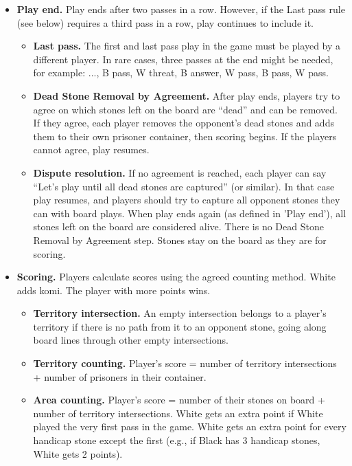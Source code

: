 \documentclass[11pt]{article}
\begin{document}
\begin{itemize}
\item \textbf{Play end.} Play ends after two passes in a row.
However, if the Last pass rule (see below) requires a third pass in a row, play continues to include it.
    \begin{itemize}
    \item \textbf{Last pass.} The first and last pass play in the game must be played by a different player.
    In rare cases, three passes at the end might be needed, for example: ..., B pass, W threat, B answer, W pass, B pass, W pass.
    \item \textbf{Dead Stone Removal by Agreement.} After play ends, players try to agree on which stones left on the board are ``dead'' and can be removed.
    If they agree, each player removes the opponent's dead stones and adds them to their own prisoner container, then scoring begins.
    If the players cannot agree, play resumes.
    \item \textbf{Dispute resolution.} If no agreement is reached, each player can say ``Let's play until all dead stones are captured'' (or similar).
    In that case play resumes, and players should try to capture all opponent stones they can with board plays.
    When play ends again (as defined in 'Play end'), all stones left on the board are considered alive.
    There is no Dead Stone Removal by Agreement step.
    Stones stay on the board as they are for scoring.
    \end{itemize}

\item \textbf{Scoring.} Players calculate scores using the agreed counting method.
White adds komi.
The player with more points wins.
    \begin{itemize}
    \item \textbf{Territory intersection.} An empty intersection belongs to a player's territory if there is no path from it to an opponent stone, going along board lines through other empty intersections.
    \item \textbf{Territory counting.} Player's score = number of territory intersections + number of prisoners in their container.
    \item \textbf{Area counting.} Player's score = number of their stones on board + number of territory intersections.
    White gets an extra point if White played the very first pass in the game.
    White gets an extra point for every handicap stone except the first (e.g., if Black has 3 handicap stones, White gets 2 points).
    \end{itemize}
\end{itemize}
\end{document}
